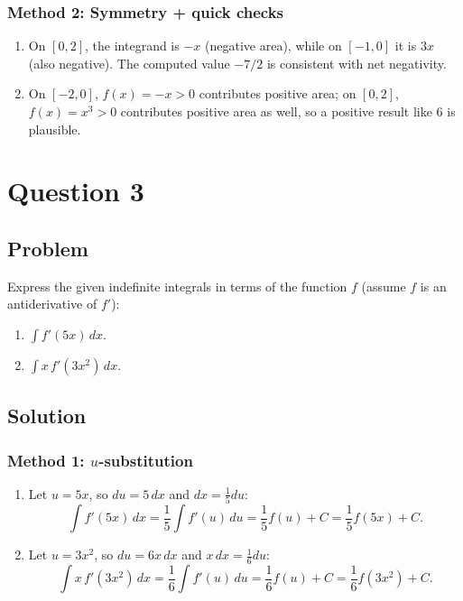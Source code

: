 \documentclass[12pt]{article}
\begin{document}
\subsubsection*{Method 2: Symmetry + quick checks}

\begin{enumerate}[label=(\roman*)]
\item On \([0,2]\), the integrand is \(-x\) (negative area), while on \([-1,0]\) it is \(3x\) (also negative). The computed value \(-7/2\) is consistent with net negativity.

\item On \([-2,0]\), \(f(x)=-x>0\) contributes positive area; on \([0,2]\), \(f(x)=x^3>0\) contributes positive area as well, so a positive result like \(6\) is plausible.
\end{enumerate}

\bigskip


\newpage

\section*{Question 3}

\subsection*{Problem}

Express the given indefinite integrals in terms of the function \(f\) (assume \(f\) is an antiderivative of \(f'\)):
\begin{enumerate}[label=(\roman*)]
\item \(\displaystyle \int f'(5x)\,dx.\)
\item \(\displaystyle \int x\,f'(3x^2)\,dx.\)
\end{enumerate}

\subsection*{Solution}

\subsubsection*{Method 1: \(u\)-substitution}

\begin{enumerate}[label=(\roman*)]
\item Let \(u=5x\), so \(du=5\,dx\) and \(dx=\frac{1}{5}du\):
\[
\int f'(5x)\,dx=\frac{1}{5}\int f'(u)\,du=\frac{1}{5}f(u)+C=\frac{1}{5}f(5x)+C.
\]

\item Let \(u=3x^2\), so \(du=6x\,dx\) and \(x\,dx=\frac{1}{6}du\):
\[
\int x\,f'(3x^2)\,dx=\frac{1}{6}\int f'(u)\,du=\frac{1}{6}f(u)+C=\frac{1}{6}f(3x^2)+C.
\]
\end{enumerate}
\end{document}
